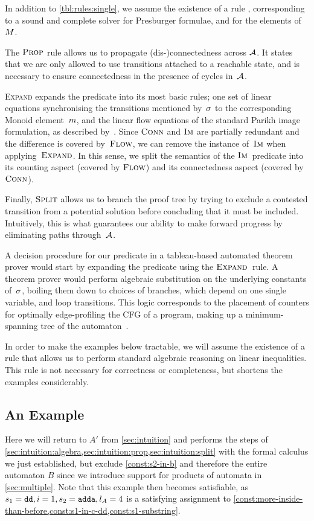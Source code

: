 In addition to \cref{tbl:rules:single}, we assume the existence of a rule
\PresburgerClose{}, corresponding to a sound and complete solver for Presburger
formulae, and for the elements of~$M$.

The $\textsc{Prop}{}$ rule allows us to propagate (dis-)connectedness across
$\mathcal{A}$. It states that we are only allowed to use transitions attached to
a reachable state, and is necessary to ensure connectedness in the presence of
cycles in~$\mathcal{A}$.

\textsc{Expand} expands the predicate into its most basic rules; one set of
linear equations synchronising the transitions mentioned by~$\operatorname{\sigma}$ to the
corresponding Monoid element~$m$, and the linear flow equations of
the standard Parikh image formulation, as described by~\FlowEq. Since
$\operatorname{\textsc{Conn}}$ and $\operatorname{\textsc{Im}}$ are partially redundant and the difference is covered
by~$\textsc{Flow}$, we can remove the instance of~$\operatorname{\textsc{Im}}$ when applying~$\textsc{Expand}$. In
this sense, we split the semantics of the $\operatorname{\textsc{Im}}$~predicate into its counting
aspect (covered by $\textsc{Flow}$) and its connectedness aspect (covered by
$\operatorname{\textsc{Conn}}$).

Finally, $\textsc{Split}{}$ allows us to branch the proof tree by trying to exclude a
contested transition from a potential solution before concluding that it must be
included. Intuitively, this is what guarantees our ability to make forward
progress by eliminating paths through~$\mathcal{A}$.

A decision procedure for our predicate in a tableau-based automated theorem
prover would start by expanding the predicate using the $\textsc{Expand}{}$~rule. A
theorem prover would perform algebraic substitution on the underlying constants
of~$\operatorname{\sigma}$, boiling them down to choices of branches, which depend on one
single variable, and loop transitions. This logic corresponds to the placement
of counters for optimally edge-profiling the CFG of a program, making up a
minimum-spanning tree of the automaton~\cite{path-profiling}.

In order to make the examples below tractable, we will assume the existence of a
rule \EquationReasoning{} that allows us to perform standard algebraic reasoning
on linear inequalities. This rule is not necessary for correctness or
completeness, but shortens the examples considerably.

\subsection{An Example}\label{sec:single:example}
Here we will return to $A'$ from \cref{sec:intuition} and performs the steps of
\cref{sec:intuition:algebra,sec:intuition:prop,sec:intuition:split} with the
formal calculus we just established, but exclude \cref{const:s2-in-b} and
therefore the entire automaton $B$ since we introduce support for products of
automata in \cref{sec:multiple}. Note that this example then becomes
satisfiable, as $s_1 = \texttt{dd}, i = 1, s_2 = \texttt{adda}, l_A = 4$ is a
satisfying assignment to
\cref{const:more-inside-than-before,const:s1-in-c-dd,const:s1-substring}.

